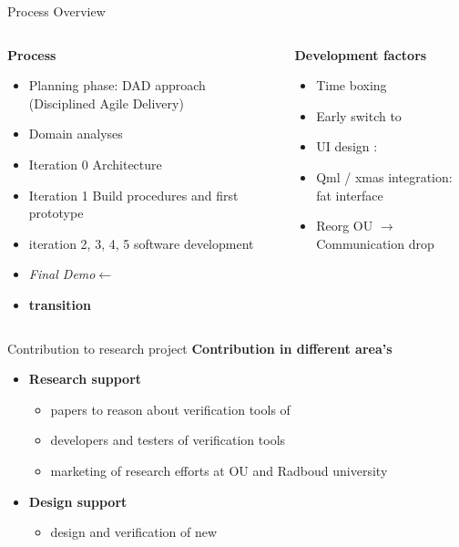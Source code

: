 \documentclass[11pt]{beamer}
\begin{document}
\begin{frame}{Process Overview}
	\begin{columns}
		\begin{column}[t]{5cm}
			{\bf Process}
			\begin{itemize}
				\item <1->Planning phase: DAD approach (Disciplined Agile Delivery)
				\item <1->Domain analyses
				\item <1->Iteration 0 Architecture
				\item <1->Iteration 1 Build procedures and first prototype
				\item <1->iteration 2, 3, 4, 5 software development
				\item <1->\textit{Final Demo}$\leftarrow$
				\item <1->\textbf{transition}
			\end{itemize}
		\end{column}
		\begin{column}[t]{5cm}
			\textbf{Development factors}
			\begin{itemize}
				\item <2->Time boxing
				\item <2->Early switch to \qt
				\item <2->UI design : \qml
				\item <2->Qml / xmas integration: fat interface
				\item <2->Reorg OU $\rightarrow$ Communication drop
			\end{itemize}
		\end{column}
	\end{columns}
\end{frame}

\begin{frame}{Contribution to research project}
	\textbf{Contribution in different area's}
	\begin{itemize}
		\item {\bf Research support}
		\begin{itemize}
			\item papers to reason about verification tools of \Noc
			\item developers and testers of verification tools
			\item marketing of research efforts at OU and Radboud university
		\end{itemize}
		\item {\bf Design support}
		\begin{itemize}
			\item design and verification of new \Noc
		\end{itemize}
	\end{itemize}

\end{frame}
\end{document}
